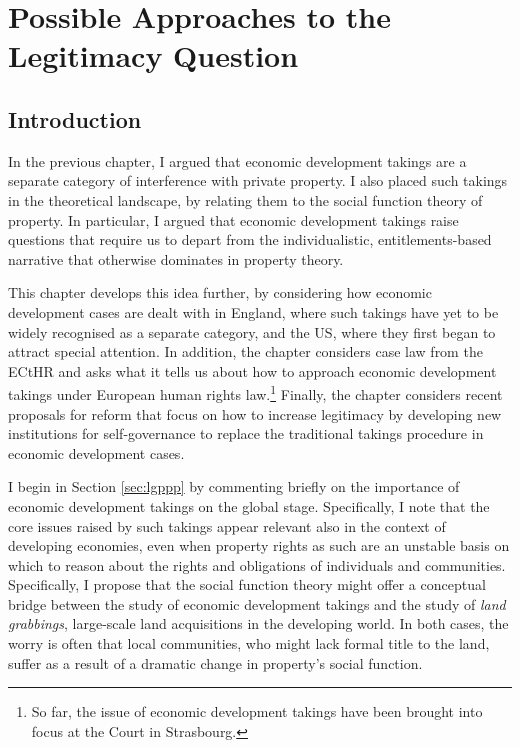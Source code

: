 
\chapter{Possible Approaches to the Legitimacy Question}\label{chap:2}

\section{Introduction}\label{sec:intro}

In the previous chapter, I argued that economic development takings are a separate category of interference with private property. I also placed such takings in the theoretical landscape, by relating them to the social function theory of property. In particular, I argued that economic development takings raise questions that require us to depart from the individualistic, entitlements-based narrative that otherwise dominates in property theory.

This chapter develops this idea further, by considering how economic development cases are dealt with in England, where such takings have yet to be widely recognised as a separate category, and the US, where they first began to attract special attention. In addition, the chapter considers case law from the ECtHR and asks what it tells us about how to approach economic development takings under European human rights law.\footnote{So far, the issue of economic development takings have been brought into focus at the Court in Strasbourg.}
Finally, the chapter considers recent proposals for reform that focus on how to increase legitimacy by developing new institutions for self-governance to replace the traditional takings procedure in economic development cases.

I begin in Section \ref{sec:lgppp} by commenting briefly on the importance of economic development takings on the global stage. Specifically, I note that the core issues raised by such takings appear relevant also in the context of developing economies, even when property rights as such are an unstable basis on which to reason about the rights and obligations of individuals and communities. Specifically, I propose that the social function theory might offer a conceptual bridge between the study of economic development takings and the study of {\it land grabbings}, large-scale land acquisitions in the developing world. In both cases, the worry is often that local communities, who might lack formal title to the land, suffer as a result of a dramatic change in property's social function.


